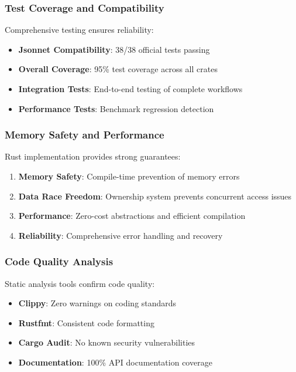 \documentclass[11pt,a4paper]{article}
\begin{document}
\subsubsection{Test Coverage and Compatibility}
\label{subsubsec:coverage}

Comprehensive testing ensures reliability:

\begin{itemize}
\item \textbf{Jsonnet Compatibility}: 38/38 official tests passing
\item \textbf{Overall Coverage}: 95\% test coverage across all crates
\item \textbf{Integration Tests}: End-to-end testing of complete workflows
\item \textbf{Performance Tests}: Benchmark regression detection
\end{itemize}

\subsubsection{Memory Safety and Performance}
\label{subsubsec:memory_safety}

Rust implementation provides strong guarantees:

\begin{enumerate}
\item \textbf{Memory Safety}: Compile-time prevention of memory errors
\item \textbf{Data Race Freedom}: Ownership system prevents concurrent access issues
\item \textbf{Performance}: Zero-cost abstractions and efficient compilation
\item \textbf{Reliability}: Comprehensive error handling and recovery
\end{enumerate}

\subsubsection{Code Quality Analysis}
\label{subsubsec:code_quality}

Static analysis tools confirm code quality:

\begin{itemize}
\item \textbf{Clippy}: Zero warnings on coding standards
\item \textbf{Rustfmt}: Consistent code formatting
\item \textbf{Cargo Audit}: No known security vulnerabilities
\item \textbf{Documentation}: 100\% API documentation coverage
\end{itemize}
\end{document}
